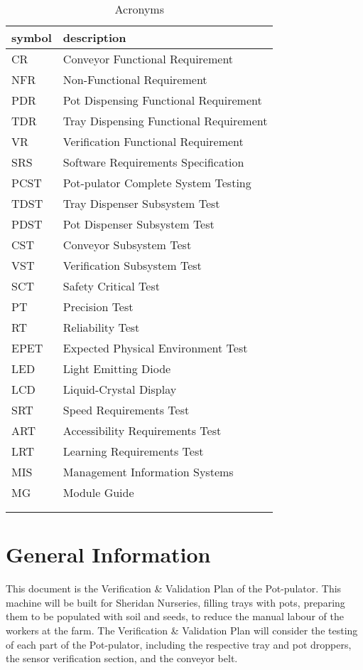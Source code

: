 \documentclass[12pt, titlepage]{article}
\begin{document}
\begin{longtable}{ p{4cm}p{8cm}  }
  \toprule		
  \textbf{symbol} & \textbf{description}\\
  \midrule 
  CR & Conveyor Functional Requirement\\
  NFR & Non-Functional Requirement\\
  PDR & Pot Dispensing Functional Requirement\\
  TDR & Tray Dispensing Functional Requirement\\
  VR & Verification Functional Requirement\\
  SRS & Software Requirements Specification\\
  PCST & Pot-pulator Complete System Testing\\
  TDST & Tray Dispenser Subsystem Test\\
  PDST & Pot Dispenser Subsystem Test\\
  CST & Conveyor Subsystem Test\\
  VST & Verification Subsystem Test\\
  SCT & Safety Critical Test\\
  PT & Precision Test\\
  RT & Reliability Test\\
  EPET & Expected Physical Environment Test\\
  LED & Light Emitting Diode\\
  LCD & Liquid-Crystal Display\\
  SRT & Speed Requirements Test\\
  ART & Accessibility Requirements Test\\
  LRT & Learning Requirements Test\\
  MIS & Management Information Systems\\
 MG & Module Guide\\

  \bottomrule
\\
\caption{Acronyms}
\label{tab:title}
\end{longtable}



\newpage


\section{General Information}

This document is the Verification \& Validation Plan of the Pot-pulator. This machine will be built for Sheridan Nurseries, filling trays with pots, preparing them to be populated with soil and seeds, to reduce the manual labour of the workers at the farm. The Verification \& Validation Plan will consider the testing of each part of the Pot-pulator, including the respective tray and pot droppers, the sensor verification section, and the conveyor belt. 
\end{document}
